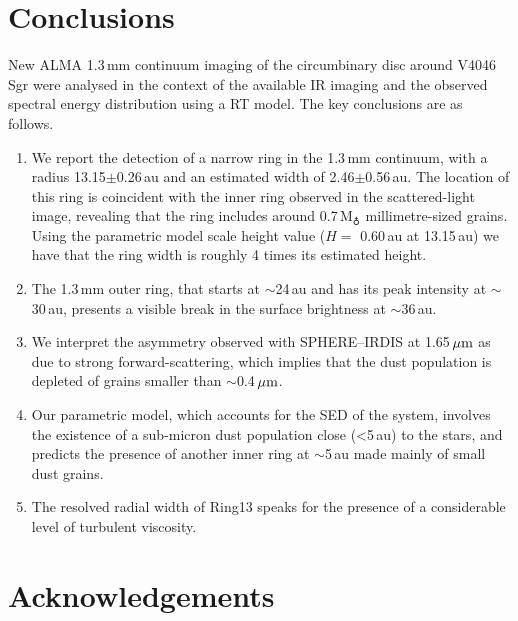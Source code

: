\documentclass[usenatbib,times]{mnras}
\begin{document}
\section{Conclusions} \label{sec:Conclusions}

New ALMA 1.3\,mm continuum imaging of the circumbinary disc around V4046\,Sgr were analysed in the context of the available IR imaging and the observed spectral energy distribution using a RT model. The key conclusions are as follows.
\begin{enumerate}
  \item We report the detection of a narrow ring in the 1.3\,mm continuum, with a radius 13.15$\pm$0.26\,au and an estimated width of 2.46$\pm$0.56\,au. The location of this ring is coincident with the inner ring observed in the scattered-light image, revealing that the ring includes around 0.7\,M$_{\earth}$ millimetre-sized grains. Using the parametric model scale height value ($H=$ 0.60\,au at 13.15\,au) we have that the ring width is roughly 4 times its estimated height.
  
  \item The 1.3\,mm outer ring, that starts at $\sim$24\,au and has its peak intensity at $\sim$30\,au, presents a visible break in the surface brightness at $\sim$36\,au. 
  
  \item We interpret the asymmetry observed with SPHERE--IRDIS at 1.65\,$\hbox{$\mu$m}$ as due to strong forward-scattering, which implies that the dust population is depleted of grains smaller than $\sim$0.4\,$\hbox{$\mu$m}$.
  
  \item Our parametric model, which accounts for the SED of the system, involves the existence of a sub-micron dust population close (<5\,au) to the stars, and predicts the presence of another inner ring at $\sim$5\,au made mainly of small dust grains.
  
  \item The resolved radial width of Ring13 speaks for the presence of a considerable level of turbulent viscosity.

    
\end{enumerate}



\section*{Acknowledgements}
\end{document}

